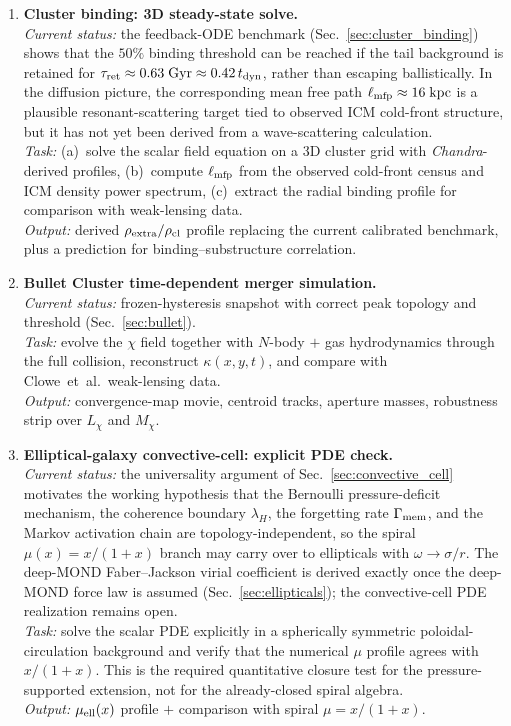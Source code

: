 \documentclass[11pt]{article}
\begin{document}
\begin{enumerate}
\item \textbf{Cluster binding: 3D steady-state solve.}\\
  \textit{Current status:} the feedback-ODE benchmark
  (Sec.~\ref{sec:cluster_binding}) shows that the $50\%$
  binding threshold can be reached if the tail background is retained for
  $\tau_{\rm ret}\approx0.63\;\mathrm{Gyr}\approx0.42\,t_{\rm dyn}$,
  rather than escaping ballistically.  In the diffusion picture, the
  corresponding mean free path $\ell_{\rm mfp}\approx16\;\mathrm{kpc}$
  is a plausible resonant-scattering target tied to observed ICM
  cold-front structure, but it has not yet been derived from a
  wave-scattering calculation.\\
  \textit{Task:} (a)~solve the scalar field equation on a 3D
  cluster grid with \textit{Chandra}-derived profiles,
  (b)~compute $\ell_{\rm mfp}$ from the observed cold-front
  census and ICM density power spectrum,
  (c)~extract the radial binding profile for comparison with
  weak-lensing data.\\
  \textit{Output:} derived $\rho_{\rm extra}/\rho_{\rm cl}$
  profile replacing the current calibrated benchmark, plus a
  prediction for binding--substructure correlation.

\item \textbf{Bullet Cluster time-dependent merger simulation.}\\
  \textit{Current status:} frozen-hysteresis snapshot with correct
  peak topology and threshold
  (Sec.~\ref{sec:bullet}).\\
  \textit{Task:} evolve the $\chi$ field together with
  $N$-body $+$ gas hydrodynamics through the full collision,
  reconstruct $\kappa(x,y,t)$, and compare with
  Clowe~et~al.\ weak-lensing data.\\
  \textit{Output:} convergence-map movie, centroid tracks,
  aperture masses, robustness strip over $L_\chi$ and $M_\chi$.

\item \textbf{Elliptical-galaxy convective-cell: explicit PDE check.}\\
  \textit{Current status:} the universality argument of
  Sec.~\ref{sec:convective_cell} motivates the working hypothesis that the
  Bernoulli pressure-deficit mechanism, the coherence boundary
  $\lambda_H$, the forgetting rate $\Gamma_{\rm mem}$, and the
  Markov activation chain are topology-independent, so the spiral
  $\mu(x)=x/(1+x)$ branch may carry over to ellipticals with
  $\omega\to\sigma/r$.  The deep-MOND Faber--Jackson virial
  coefficient is derived exactly once the deep-MOND force law is
  assumed (Sec.~\ref{sec:ellipticals}); the convective-cell PDE
  realization remains open.\\
  \textit{Task:} solve the scalar PDE explicitly in a spherically
  symmetric poloidal-circulation background and verify that the
  numerical $\mu$ profile agrees with $x/(1+x)$.  This is the
  required quantitative closure test for the pressure-supported
  extension, not for the already-closed spiral algebra.\\
  \textit{Output:} $\mu_{\rm ell}(x)$ profile $+$ comparison
  with spiral $\mu=x/(1+x)$.

\end{enumerate}
\end{document}
